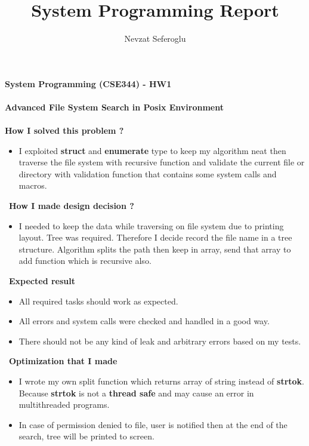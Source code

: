 \documentclass[12pt]{article}
\title{System Programming Report}
\author {Nevzat Seferoglu}
\begin{document}
\begin{center} \Large \end{center}
{\large \textbf{System Programming (CSE344) - HW1}} \\\\
{\large \textbf{Advanced File System Search in Posix Environment}} \\\\
\textbf{How I solved this problem ?}
\begin{itemize}
    \item{I exploited \textbf{struct} and \textbf{enumerate} type to keep my algorithm neat then traverse the file system with recursive function and validate the current file or directory with validation function that contains some system calls and macros.}
\end{itemize}\
\textbf{How I made design decision ?}
\begin{itemize}
    \item{I needed to keep the data while traversing on file system due to printing layout. Tree was required. Therefore I decide record the file name in a tree structure. Algorithm splits the path then keep in array, send that array to add function which is recursive also.}
\end{itemize}\
\textbf{Expected result}
\begin{itemize}
    \item{All required tasks should work as expected.}
    \item{All errors and system calls were checked and handled in a good way.}
    \item{There should not be any kind of leak and arbitrary errors based on my tests.}
\end{itemize}\
\textbf{Optimization that I made}
\begin{itemize}
    \item{I wrote my own split function which returns array of string instead of \textbf{strtok}. Because \textbf{strtok} is not a \textbf{thread safe} and may cause an error in multithreaded programs.}
    \item{In case of permission denied to file, user is notified then at the end of the search, tree will be printed to screen.}
\end{itemize}
\end{document}
